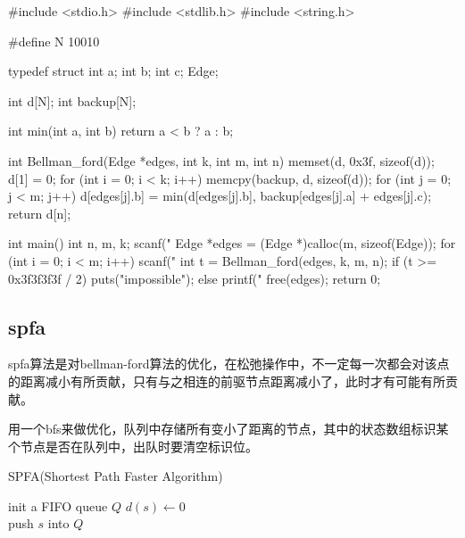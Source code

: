 \begin{mycpptwocol}
    #include <stdio.h>
    #include <stdlib.h>
    #include <string.h>

    #define N 10010

    typedef struct {
        int a;
        int b;
        int c;
    } Edge;

    int d[N];
    int backup[N];

    int min(int a, int b) {
        return a < b ? a : b;
    }

    int Bellman_ford(Edge *edges, int k, int m, int n) {
        memset(d, 0x3f, sizeof(d));
        d[1] = 0;
        for (int i = 0; i < k; i++) {
            memcpy(backup, d, sizeof(d));
            for (int j = 0; j < m; j++) {
                d[edges[j].b] = min(d[edges[j].b], backup[edges[j].a] + edges[j].c);
            }
        }
        return d[n];
    }

    int main() {
        int n, m, k;
        scanf("%
        Edge *edges = (Edge *)calloc(m, sizeof(Edge));
        for (int i = 0; i < m; i++) {
            scanf("%
        }
        int t = Bellman_ford(edges, k, m, n);
        if (t >= 0x3f3f3f3f / 2) {
            puts("impossible");
        } else {
            printf("%
        }
        free(edges);
        return 0;
    }
\end{mycpptwocol}

\subsection{spfa}
spfa算法是对bellman-ford算法的优化，在松弛操作中，不一定每一次都会对该点的距离减小有所贡献，只有与之相连的前驱节点距离减小了，此时才有可能有所贡献。

用一个bfs来做优化，队列中存储所有变小了距离的节点，其中的状态数组标识某个节点是否在队列中，出队时要清空标识位。

%

\begin{algorithm}[H] %
    \caption{SPFA(Shortest Path Faster Algorithm)}
    \SetAlgoLined
    init a FIFO queue $Q$\;
    $d(s) \leftarrow 0$\\
    push $s$ into $Q$\\
\end{algorithm}

